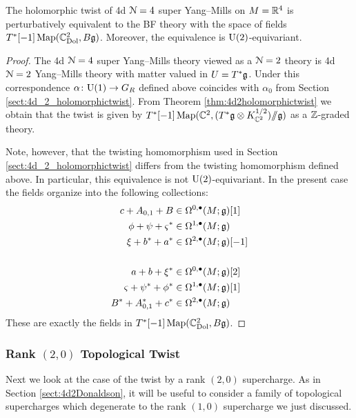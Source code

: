 \documentclass[10pt, oneside]{article}
\begin{document}
\begin{theorem}
The holomorphic twist of 4d $\mathcal N=4$ super Yang--Mills on $M=\mathbb R^4$ is perturbatively equivalent to the BF theory with the space of fields $T^*[-1] \operatorname{Map}(\mathbb C^2_{\rm Dol} , B \mathfrak g)$. Moreover, the equivalence is $\mathrm{U}(2)$-equivariant.
\label{thm:4d4holomorphictwist}
\end{theorem}
\begin{proof}
The 4d $\mathcal N=4$ super Yang--Mills theory viewed as a $\mathcal N=2$ theory is 4d $\mathcal N=2$ Yang--Mills theory with matter valued in $U=T^*\mathfrak g$. Under this correspondence $\alpha\colon \mathrm{U}(1)\rightarrow G_R$ defined above coincides with $\alpha_0$ from Section \ref{sect:4d_2_holomorphictwist}. From Theorem \ref{thm:4d2holomorphictwist} we obtain that the twist is given by $T^*[-1] \operatorname{Map}(\mathbb C^2 , (T^*\mathfrak g\otimes K_{\mathbb C^2}^{1/2})/\!\!/ \mathfrak g)$ as a $\mathbb Z$-graded theory.

Note, however, that the twisting homomorphism used in Section \ref{sect:4d_2_holomorphictwist} differs from the twisting homomorphism defined above. In particular, this equivalence is not $\mathrm{U}(2)$-equivariant. In the present case the fields organize into the following collections:
\begin{align*}
c+A_{0, 1}+B&\in\Omega^{0, \bullet}(M; \mathfrak g)[1] \\
\phi + \psi + \varsigma^*&\in\Omega^{1, \bullet}(M; \mathfrak g) \\
\xi + b^* + a^*&\in\Omega^{2, \bullet}(M; \mathfrak g)[-1] \\
\\
a + b + \xi^*&\in\Omega^{0, \bullet}(M; \mathfrak g)[2] \\
\varsigma + \psi^* + \phi^* &\in\Omega^{1, \bullet}(M; \mathfrak g)[1] \\
B^*+A^*_{0, 1}+ c^*&\in\Omega^{2, \bullet}(M; \mathfrak g)
\end{align*}
These are exactly the fields in $T^*[-1] \operatorname{Map}(\mathbb C^2_{\rm Dol} , B \mathfrak g)$.
\end{proof}

\subsubsection{Rank \texorpdfstring{$(2,0)$}{(2,0)} Topological Twist}
\label{sect:4d4Atwist}

Next we look at the case of the twist by a rank $(2,0)$ supercharge. 
As in Section \ref{sect:4d2Donaldson}, it will be useful to consider a family of topological supercharges which degenerate to the rank $(1,0)$ supercharge we just discussed. 
\end{document}
